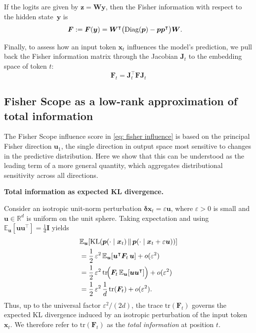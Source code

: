 \documentclass{article}
\begin{document}
If the logits are given by $\bm{z} = \bm{W} \bm{y}$, then the Fisher
information with respect to the hidden state~$\bm{y}$ is
\begin{align}
\bm{F}:=\bm{F}(\bm{y})
&=
\bm{W}^\intercal
\bigl(
\mathrm{Diag}(\bm{p}) - \bm{p}\bm{p}^\intercal
\bigr)
\bm{W}.
\notag
\end{align}

Finally, to assess how an input token $\bm{x}_t$ influences the
model’s prediction, we pull back \cite{arvanitidis2022pullinginformationgeometry} the Fisher information matrix through the Jacobian $\bm{J}_t$ to the embedding space of token $t$:
\begin{equation}
\bm{F}_t = \bm{J}_t^\intercal \bm{F} \bm{J}_t  
\end{equation}


\subsection{Fisher Scope as a low-rank approximation of total information}
\label{app:fisher_total_information}

The Fisher Scope influence score in \cref{eq: fisher influence} is based on 
the principal Fisher direction $\bm{u}_1$, the single direction in output 
space most sensitive to changes in the predictive distribution. Here we show 
that this can be understood as the leading term of a more general quantity, which aggregates distributional sensitivity 
across all directions.

\noindent\textbf{Total information as expected KL divergence.}

Consider an isotropic unit-norm perturbation $\bm{\delta x}_t= \varepsilon \bm{u}$, 
where $\varepsilon > 0$ is small and $\bm{u} \in \mathbb{R}^d$ is uniform on 
the unit sphere. 
Taking expectation and using
$\mathbb{E}_{\bm{u}}[\bm{u}\bm{u}^\intercal]=\tfrac{1}{d}\bm{I}$ yields
\begin{align}
&\mathbb{E}_{\bm{u}}\!\left[
\mathrm{KL}\!\left(\bm{p}(\cdot\mid \bm{x}_t) \,\middle\|\, \bm{p}(\cdot\mid \bm{x}_t+\varepsilon\bm{u})\right)
\right] \notag \\
&=
\frac{1}{2}\,\varepsilon^2\,
\mathbb{E}_{\bm{u}}\!\left[\bm{u}^\intercal \bm{F}_t\,\bm{u}\right]
+ o(\varepsilon^2)
\notag\\
&=
\frac{1}{2}\,\varepsilon^2\,
\mathrm{tr}\!\Big(\bm{F}_t\,\mathbb{E}_{\bm{u}}[\bm{u}\bm{u}^\intercal]\Big)
+ o(\varepsilon^2)
\notag\\
&=
\frac{1}{2}\,\varepsilon^2\,
\frac{1}{d}\,
\mathrm{tr}(\bm{F}_t)
+ o(\varepsilon^2).
\label{eq:expected_kl_trace}
\end{align}
Thus, up to the universal factor $\varepsilon^2/(2d)$, the trace 
$\mathrm{tr}(\bm{F}_t)$ governs the expected KL divergence induced by an 
isotropic perturbation of the input token $\bm{x}_t$. We therefore refer 
to $\mathrm{tr}(\bm{F}_t)$ as the \emph{total information} at position $t$.
\end{document}
